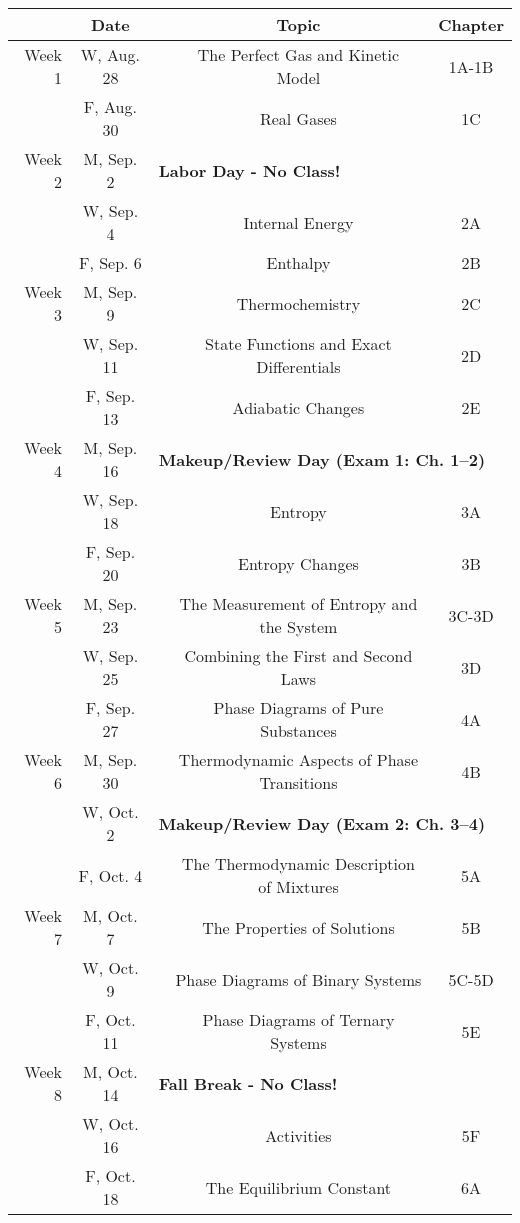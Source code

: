 \documentclass[12pt, letterpaper]{article}
\begin{document}
\noindent
\begin{tabular}{rcccc}
& Date && Topic & Chapter\\
\midrule
Week 1 & W, Aug. 28&& The Perfect Gas and Kinetic Model & 1A-1B\\
& F, Aug. 30&& Real Gases & 1C\\
\midrule
Week 2 & M, Sep. 2& \multicolumn{3}{l}{\textbf{Labor Day - No Class!}}\\
& W, Sep. 4&& Internal Energy & 2A\\
& F, Sep. 6&& Enthalpy & 2B\\
\midrule
Week 3 & M, Sep. 9&& Thermochemistry & 2C\\
& W, Sep. 11&& State Functions and Exact Differentials & 2D\\
& F, Sep. 13&& Adiabatic Changes & 2E\\
\midrule
Week 4 & M, Sep. 16& \multicolumn{3}{l}{\textbf{Makeup/Review Day (Exam 1: Ch. 1--2)}}\\
& W, Sep. 18&& Entropy & 3A\\
& F, Sep. 20&& Entropy Changes & 3B\\
\midrule
Week 5 & M, Sep. 23&& The Measurement of Entropy and the System & 3C-3D\\
& W, Sep. 25&& Combining the First and Second Laws & 3D\\
& F, Sep. 27&& Phase Diagrams of Pure Substances & 4A\\
\midrule
Week 6 & M, Sep. 30&& Thermodynamic Aspects of Phase Transitions & 4B\\
& W, Oct. 2& \multicolumn{3}{l}{\textbf{Makeup/Review Day (Exam 2: Ch. 3--4)}}\\
& F, Oct. 4&& The Thermodynamic Description of Mixtures & 5A\\
\midrule
Week 7 & M, Oct. 7&& The Properties of Solutions & 5B\\
& W, Oct. 9&& Phase Diagrams of Binary Systems & 5C-5D\\
& F, Oct. 11&& Phase Diagrams of Ternary Systems & 5E\\
\midrule
Week 8 & M, Oct. 14& \multicolumn{3}{l}{\textbf{Fall Break - No Class!}}\\
& W, Oct. 16&& Activities & 5F\\
& F, Oct. 18&& The Equilibrium Constant & 6A\\
\end{tabular}
\end{document}
